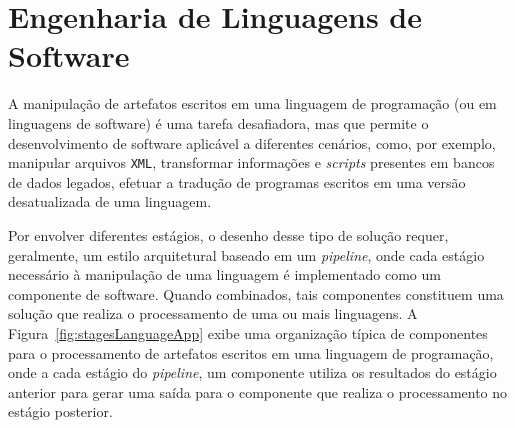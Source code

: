  



\section{Engenharia de Linguagens de Software}\label{sec:softEng}



A manipulação de artefatos escritos em 
uma linguagem de programação (ou em linguagens de software) 
é uma tarefa desafiadora, mas que permite o desenvolvimento 
de software aplicável a diferentes cenários, como, por exemplo, 
manipular arquivos \texttt{XML}, transformar 
informações e \textit{scripts} presentes 
em bancos de dados legados, efetuar a tradução de programas 
escritos em uma versão desatualizada de uma linguagem. 

Por envolver diferentes estágios, o desenho desse tipo de solução requer, geralmente, 
um estilo arquitetural baseado em um \emph{pipeline},  onde cada estágio necessário à manipulação de uma linguagem é implementado como um componente de software. Quando combinados, 
tais componentes constituem uma solução que realiza o processamento 
de uma ou mais linguagens. A Figura~\ref{fig:stagesLanguageApp} exibe uma organização 
típica de componentes para o processamento de artefatos escritos em uma linguagem de 
programação, onde a cada estágio do \emph{pipeline}, um componente 
utiliza os resultados do estágio anterior para gerar uma saída para o componente 
que realiza o processamento no estágio posterior.  

